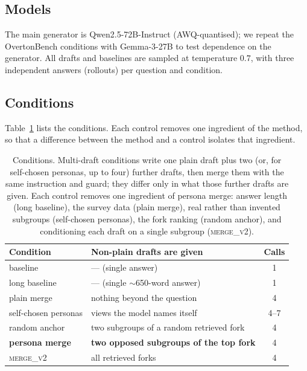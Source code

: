 \documentclass[11pt]{article}
\begin{document}
\subsection{Models}
The main generator is Qwen2.5-72B-Instruct (AWQ-quantised); we repeat the
OvertonBench conditions with Gemma-3-27B to test dependence on the generator.
All drafts and baselines are sampled at temperature $0.7$, with three
independent answers (rollouts) per question and condition.

\subsection{Conditions}
Table~\ref{tab:conditions} lists the conditions. Each control removes one
ingredient of the method, so that a difference between the method and a
control isolates that ingredient.

\begin{table}[t]
\centering
\small
\begin{tabular}{@{}p{2.2cm}p{3.6cm}c@{}}
\toprule
Condition & Non-plain drafts are given & Calls \\
\midrule
baseline             & --- (single answer)                  & 1 \\
long baseline        & --- (single $\sim$650-word answer)   & 1 \\
plain merge          & nothing beyond the question          & 4 \\
self-chosen personas & views the model names itself         & 4--7 \\
random anchor        & two subgroups of a random retrieved fork & 4 \\
\textbf{persona merge} & \textbf{two opposed subgroups of the top fork} & 4 \\
\textsc{merge\_v2}   & all retrieved forks                  & 4 \\
\bottomrule
\end{tabular}
\caption{Conditions. Multi-draft conditions write one plain draft plus two (or,
for self-chosen personas, up to four) further drafts, then merge them with the
same instruction and guard; they differ only in what those further drafts are
given. Each control removes one ingredient of persona merge: answer length
(long baseline), the survey data (plain merge), real rather than invented
subgroups (self-chosen personas), the fork ranking (random anchor), and
conditioning each draft on a single subgroup (\textsc{merge\_v2}).}
\label{tab:conditions}
\end{table}
\end{document}
